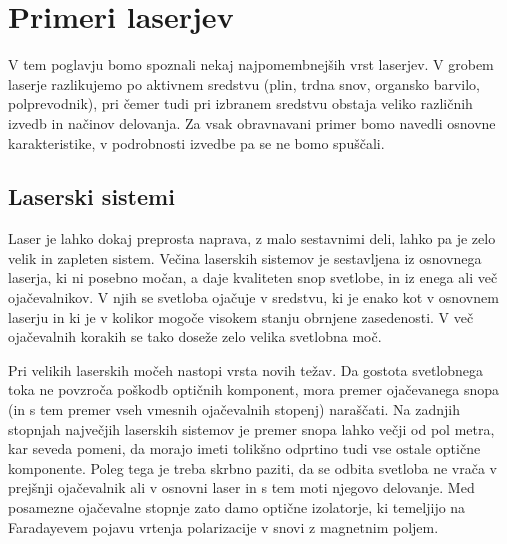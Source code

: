\chapter{Primeri laserjev}
\label{chap:Primeri}
V tem poglavju bomo spoznali nekaj najpomembnejših vrst laserjev.
V grobem laserje razlikujemo po aktivnem sredstvu 
(plin, trdna snov, organsko barvilo, polprevodnik), pri čemer tudi pri izbranem
sredstvu obstaja veliko različnih izvedb in načinov delovanja. Za vsak 
obravnavani primer bomo navedli osnovne karakteristike, v podrobnosti 
izvedbe pa se ne bomo spuščali. 

\section{Laserski sistemi}
Laser  je lahko dokaj preprosta naprava, z malo sestavnimi deli, 
lahko pa je zelo velik in zapleten sistem. Večina laserskih sistemov
je sestavljena iz osnovnega laserja, ki ni posebno močan, a daje kvaliteten
snop svetlobe, in iz enega ali več ojačevalnikov. V njih se svetloba 
ojačuje v sredstvu, ki je enako kot v osnovnem laserju in ki je v kolikor 
mogoče visokem stanju obrnjene zasedenosti. V več ojačevalnih korakih 
se tako doseže zelo velika svetlobna moč. 

Pri velikih laserskih močeh nastopi vrsta novih težav. Da gostota 
svetlobnega toka ne povzroča poškodb optičnih komponent, mora 
premer ojačevanega snopa (in s tem premer vseh vmesnih ojačevalnih stopenj) 
naraščati. Na zadnjih stopnjah največjih laserskih sistemov je 
premer snopa lahko večji od pol metra, kar seveda pomeni, da morajo imeti tolikšno odprtino 
tudi vse ostale optične komponente. Poleg tega je
treba skrbno paziti, da se odbita svetloba ne vrača v prejšnji
ojačevalnik ali v osnovni laser in s tem moti njegovo delovanje. Med
posamezne ojačevalne stopnje zato damo optične izolatorje, ki temeljijo na Faradayevem
pojavu vrtenja polarizacije v snovi z magnetnim poljem.

